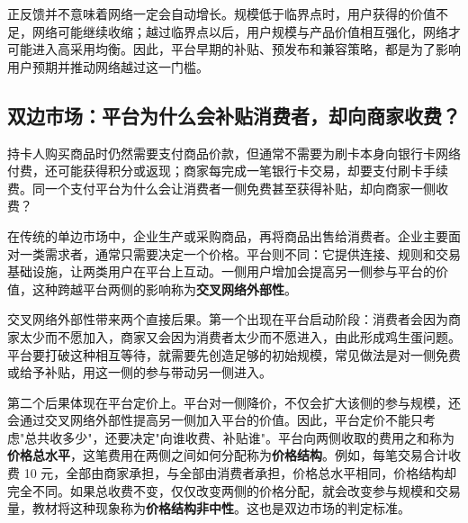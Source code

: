正反馈并不意味着网络一定会自动增长。规模低于临界点时，用户获得的价值不足，网络可能继续收缩；越过临界点以后，用户规模与产品价值相互强化，网络才可能进入高采用均衡。因此，平台早期的补贴、预发布和兼容策略，都是为了影响用户预期并推动网络越过这一门槛。

\begin{center}
\end{center}

\subsection{双边市场：平台为什么会补贴消费者，却向商家收费？}

持卡人购买商品时仍然需要支付商品价款，但通常不需要为刷卡本身向银行卡网络付费，还可能获得积分或返现；商家每完成一笔银行卡交易，却要支付刷卡手续费。同一个支付平台为什么会让消费者一侧免费甚至获得补贴，却向商家一侧收费？

在传统的单边市场中，企业生产或采购商品，再将商品出售给消费者。企业主要面对一类需求者，通常只需要决定一个价格。平台则不同：它提供连接、规则和交易基础设施，让两类用户在平台上互动。一侧用户增加会提高另一侧参与平台的价值，这种跨越平台两侧的影响称为\textbf{交叉网络外部性}。

交叉网络外部性带来两个直接后果。第一个出现在平台启动阶段：消费者会因为商家太少而不愿加入，商家又会因为消费者太少而不愿进入，由此形成鸡生蛋问题。平台要打破这种相互等待，就需要先创造足够的初始规模，常见做法是对一侧免费或给予补贴，用这一侧的参与带动另一侧进入。

第二个后果体现在平台定价上。平台对一侧降价，不仅会扩大该侧的参与规模，还会通过交叉网络外部性提高另一侧加入平台的价值。因此，平台定价不能只考虑"总共收多少"，还要决定"向谁收费、补贴谁"。平台向两侧收取的费用之和称为\textbf{价格总水平}，这笔费用在两侧之间如何分配称为\textbf{价格结构}。例如，每笔交易合计收费 10 元，全部由商家承担，与全部由消费者承担，价格总水平相同，价格结构却完全不同。如果总收费不变，仅仅改变两侧的价格分配，就会改变参与规模和交易量，教材将这种现象称为\textbf{价格结构非中性}。这也是双边市场的判定标准。

